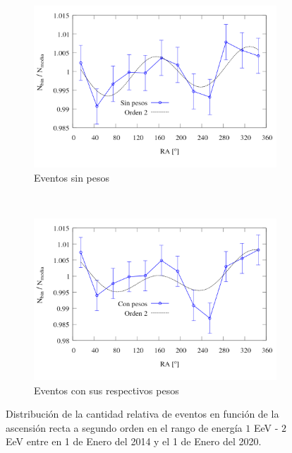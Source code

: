         \begin{figure}[H]
          \centering
            \begin{subfigure}[b]{0.7\textwidth}
		\centering
		\includegraphics[width=\linewidth]{eventos_clasificados_por_RA_v7_orden_2_sin_pesos.png}
		\vspace*{-1.2 cm}
		\caption{Eventos sin pesos}		\label{fig:bin_events_second_order_sin}
            \end{subfigure}\\
            \begin{subfigure}[b]{0.7\textwidth}
		\centering
		\includegraphics[width=\linewidth]{eventos_clasificados_por_RA_v7_orden_2_con_pesos.png}
		\vspace*{-1.2 cm}
		\caption{ Eventos con sus respectivos pesos}		\label{fig:bin_events_second_order_con}
            \end{subfigure}
           \caption{Distribución de la cantidad relativa de eventos en función de la ascensión recta a segundo orden en el rango de energía $1$ EeV - $2$ EeV entre en 1 de Enero del 2014 y el 1 de Enero del 2020.}
         \end{figure}

